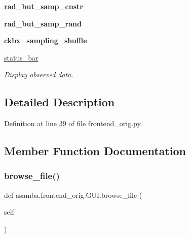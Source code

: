 \begin{DoxyCompactItemize}
{\bfseries rad\+\_\+but\+\_\+samp\+\_\+cnstr}
\item 
\mbox{\label{classasamba_1_1frontend__orig_1_1_g_u_i_a475e4be23a060b2e8594f745f182d69b}} 
{\bfseries rad\+\_\+but\+\_\+samp\+\_\+rand}
\item 
\mbox{\label{classasamba_1_1frontend__orig_1_1_g_u_i_a8e40d620a0d6c1376a716a50b580c7f2}} 
{\bfseries ckbx\+\_\+sampling\+\_\+shuffle}
\item 
\hyperlink{classasamba_1_1frontend__orig_1_1_g_u_i_a740ec5fcacbc2e7b4fa0ea061b52d411}{status\+\_\+bar}
\begin{DoxyCompactList}\small\item\em Display observed data. \end{DoxyCompactList}\end{DoxyCompactItemize}


\subsection{Detailed Description}


Definition at line 39 of file frontend\+\_\+orig.\+py.



\subsection{Member Function Documentation}
\mbox{\label{classasamba_1_1frontend__orig_1_1_g_u_i_a5160be30a39afd49a2dd9ac4aba34d1d}} 
\subsubsection{\texorpdfstring{browse\+\_\+file()}{browse\_file()}}
{\footnotesize\ttfamily def asamba.\+frontend\+\_\+orig.\+G\+U\+I.\+browse\+\_\+file (\begin{DoxyParamCaption}\item[{}]{self }\end{DoxyParamCaption})}




